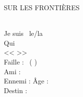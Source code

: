\documentclass[12pt,twoside,a5paper]{article}
\begin{document}
\setlength\parindent{0pt} %

SUR LES FRONTIÈRES~\\~\\

\begin{minipage}[h]{0.05\textwidth}  \end{minipage} \hfill \begin{minipage}[h]{0.95\textwidth}
	Je suis \hrulefill~le/la \hrulefill ~\\
	Qui \hrulefill ~\\
	<< \hrulefill >>~\\
	Faille :  \hrulefill~(  \hrulefill )~\\
	Ami : \hrulefill ~\\
	Ennemi : \hrulefill Âge :  \hrulefill ~\\
	Destin :  \hrulefill~\Ovalbox{~} \Ovalbox{~} \Ovalbox{~} \Ovalbox{~} \Ovalbox{~}~\\
\end{minipage}
\end{document}
